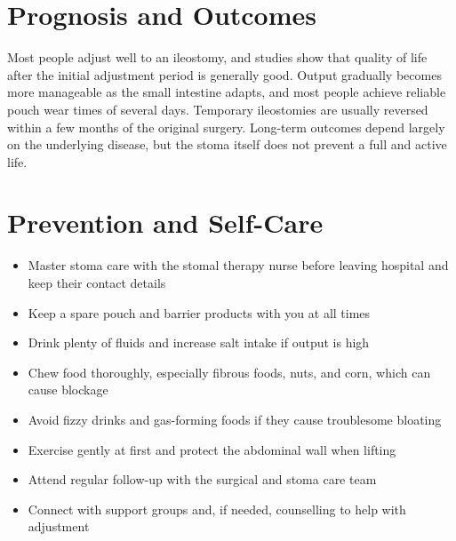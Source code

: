 \section*{Prognosis and Outcomes}
Most people adjust well to an ileostomy, and studies show that quality of life after the initial adjustment period is generally good. Output gradually becomes more manageable as the small intestine adapts, and most people achieve reliable pouch wear times of several days. Temporary ileostomies are usually reversed within a few months of the original surgery. Long-term outcomes depend largely on the underlying disease, but the stoma itself does not prevent a full and active life.

\section*{Prevention and Self-Care}
\begin{itemize}
    \item Master stoma care with the stomal therapy nurse before leaving hospital and keep their contact details
    \item Keep a spare pouch and barrier products with you at all times
    \item Drink plenty of fluids and increase salt intake if output is high
    \item Chew food thoroughly, especially fibrous foods, nuts, and corn, which can cause blockage
    \item Avoid fizzy drinks and gas-forming foods if they cause troublesome bloating
    \item Exercise gently at first and protect the abdominal wall when lifting
    \item Attend regular follow-up with the surgical and stoma care team
    \item Connect with support groups and, if needed, counselling to help with adjustment
\end{itemize}

